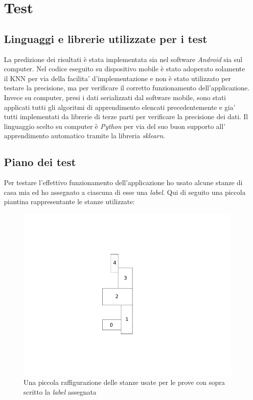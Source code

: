 \chapter{Test}

\section{Linguaggi e librerie utilizzate per i test}
La predizione dei risultati \`e stata implementata sia nel software \textit{Android} sia sul computer. Nel codice eseguito su dispositivo mobile \`e stato adoperato solamente il KNN per via della facilita' d'implementazione e non \`e stato  utilizzato per testare la precisione, ma per verificare il corretto funzionamento dell'applicazione. Invece su computer, presi i dati serializzati dal software mobile, sono stati applicati tutti gli algoritmi di apprendimento elencati precedentemente e gia' tutti implementati da librerie di terze parti per verificare la precisione dei dati. Il linguaggio scelto su computer \`e \textit{Python} per via del suo buon supporto all' apprendimento automatico tramite la libreria \textit{sklearn}.



\section{Piano dei test}
Per testare l'effettivo funzionamento dell'applicazione ho usato alcune stanze di casa mia ed ho assegnato a ciascuna di esse una \textit{label}. Qui di seguito una piccola piantina rappresentante le stanze utilizzate:

\begin{figure}[H]
\centering
\includegraphics[width=0.7\linewidth]{img/test_pianta_casa}
\caption{Una piccola raffigurazione delle stanze usate per le prove con sopra scritto la \textit{label} assegnata}
\label{fig:test_pianta_casa}
\end{figure}

